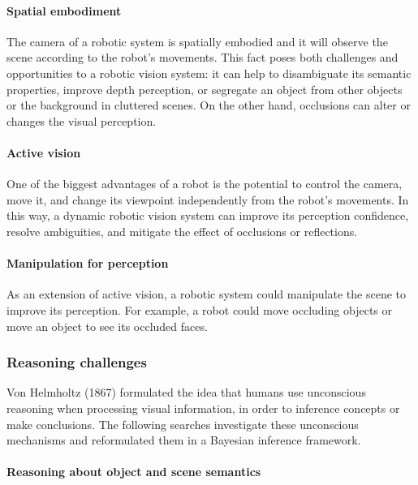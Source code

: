 \paragraph{Spatial embodiment}

The camera of a robotic system is spatially embodied and it will observe
the scene according to the robot's movements. This fact poses both
challenges and opportunities to a robotic vision system: it can help to
disambiguate its semantic properties, improve depth perception, or
segregate an object from other objects or the background in cluttered
scenes. On the other hand, occlusions can alter or changes the visual
perception.

\paragraph{Active vision}

One of the biggest advantages of a robot is the potential to control the
camera, move it, and change its viewpoint independently from the robot's
movements. In this way, a dynamic robotic vision system can improve its
perception confidence, resolve ambiguities, and mitigate the effect of
occlusions or reflections.

\paragraph{Manipulation for perception}

As an extension of active vision, a robotic system could manipulate the
scene to improve its perception. For example, a robot could move
occluding objects or move an object to see its occluded faces.

\subsubsection{Reasoning challenges}\label{header-n33}

Von Helmholtz (1867) formulated the idea that humans use unconscious
reasoning when processing visual information, in order to inference
concepts or make conclusions. The following searches investigate these
unconscious mechanisms and reformulated them in a Bayesian inference
framework.

\paragraph{Reasoning about object and scene semantics}

